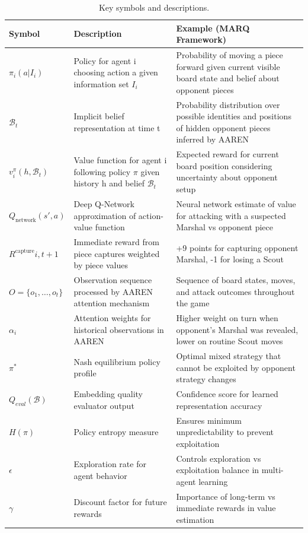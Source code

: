 \begin{table}[htbp]
    \centering
    \caption{Key symbols and descriptions.}
    \label{tab:MARQ-symbols}
    \begin{tabular}{|l|p{4cm}|p{6cm}|}
        \hline
        \textbf{Symbol} & \textbf{Description} & \textbf{Example (MARQ Framework)} \\
        \hline
        $\pi_i(a|I_i)$ & Policy for agent i choosing action a given information set $I_i$ & Probability of moving a piece forward given current visible board state and belief about opponent pieces \\
        \hline
        $\mathcal{B}_t$ & Implicit belief representation at time t & Probability distribution over possible identities and positions of hidden opponent pieces inferred by AAREN \\
        \hline
        $v^{\pi}_i(h, \mathcal{B}_t)$ & Value function for agent i following policy $\pi$ given history h and belief $\mathcal{B}_t$ & Expected reward for current board position considering uncertainty about opponent setup \\
        \hline
        $Q_{\text{network}}(s', a)$ & Deep Q-Network approximation of action-value function & Neural network estimate of value for attacking with a suspected Marshal vs opponent piece \\
        \hline
        $R^{\text{capture}}{i,t+1}$ & Immediate reward from piece captures weighted by piece values & +9 points for capturing opponent Marshal, -1 for losing a Scout \\
        \hline
        $O = \{o_1, \dots, o_t\}$ & Observation sequence processed by AAREN attention mechanism & Sequence of board states, moves, and attack outcomes throughout the game \\
        \hline
        $\alpha_i$ & Attention weights for historical observations in AAREN & Higher weight on turn when opponent's Marshal was revealed, lower on routine Scout moves \\
        \hline
        $\pi^*$ & Nash equilibrium policy profile & Optimal mixed strategy that cannot be exploited by opponent strategy changes \\
        \hline
        $Q_{eval}(\mathcal{B})$ & Embedding quality evaluator output & Confidence score for learned representation accuracy \\
        \hline
        $H(\pi)$ & Policy entropy measure & Ensures minimum unpredictability to prevent exploitation \\
        \hline
        $\epsilon$ & Exploration rate for agent behavior & Controls exploration vs exploitation balance in multi-agent learning \\
        \hline
        $\gamma$ & Discount factor for future rewards & Importance of long-term vs immediate rewards in value estimation \\
        \hline
    \end{tabular}
\end{table}


